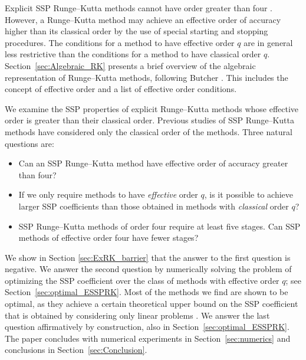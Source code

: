 \documentclass[final]{siamltex}  %
\begin{document}
Explicit SSP Runge--Kutta methods cannot have order greater
than four \cite{Ruuth2002}.  However, a Runge--Kutta method may 
achieve an effective order of accuracy higher than its classical order 
by the use of special starting and stopping procedures.
The conditions for a method to have effective order $q$ are 
in general less restrictive than the conditions for a method
to have classical order $q$.
Section~\ref{sec:Algebraic_RK} presents a brief overview of the
algebraic representation of Runge--Kutta methods, following Butcher
\cite{Butcher2008_book}.
This includes the concept of effective order and a list of effective
order conditions.

We examine the SSP properties of explicit Runge--Kutta methods whose
effective order is greater than their classical order.
Previous studies of SSP Runge--Kutta methods have considered only the
classical order of the methods.
Three natural questions are:
\begin{itemize}
    \item Can an SSP Runge--Kutta method have effective order of accuracy greater than four?
    \item If we only require methods to have {\em effective} order $q$, is it possible to achieve larger
            SSP coefficients than those obtained in methods with {\em classical} order $q$?
    \item SSP Runge--Kutta methods of order four require at least five stages.  Can SSP methods of 
          effective order four have fewer stages?
\end{itemize}
We show in Section \ref{sec:ExRK_barrier} that the answer to the first question is negative.
We answer the second question by numerically solving the problem of optimizing
the SSP coefficient over the class of methods with effective order $q$;
see Section~\ref{sec:optimal_ESSPRK}.  
Most of the methods we find are shown to be optimal, as they achieve a certain theoretical
upper bound on the SSP coefficient that is obtained by considering only
linear problems \cite{Kraaijevanger1986}.
We answer the last question affirmatively
by construction, also in Section~\ref{sec:optimal_ESSPRK}.
The paper concludes with numerical experiments in
Section~\ref{sec:numerics} and conclusions in
Section~\ref{sec:Conclusion}.
\end{document}
